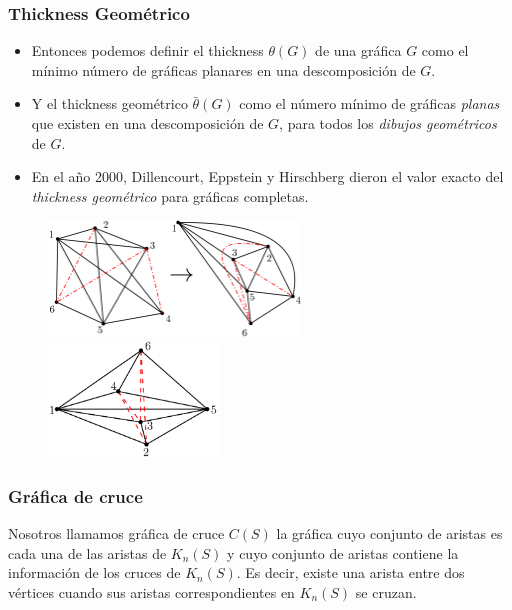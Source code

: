 \begin{frame}\frametitle{Thickness Geométrico}
	\begin{itemize}
		\item[] Entonces podemos definir el thickness $\theta(G)$ de una gráfica $G$ como el mínimo número de gráficas planares en una descomposición de $G$. 
		
		\item[] Y el thickness geométrico $\bar{\theta}(G)$ como el número mínimo de gráficas \emph{planas} que existen en una descomposición de $G$, para todos los \emph{dibujos geométricos} de $G$.
		
		\item[] En el año 2000, Dillencourt, Eppstein y Hirschberg dieron el valor exacto del \emph{thickness geométrico} para gráficas completas.\\[5pt]
	\end{itemize}
	
\end{frame}
\begin{frame}
	\begin{figure}
		\centering
		\includegraphics[width=0.6\textwidth]{images/K6_thicknes2}%
		~\vrule
		\includegraphics[width=0.4\textwidth]{images/K6_gthicknes2}
	\end{figure}
\end{frame}

\begin{frame}\frametitle{Gráfica de cruce}
Nosotros llamamos gráfica de cruce $C(S)$ la gráfica cuyo conjunto de aristas es cada una de las aristas de $K_n(S)$ y cuyo conjunto de aristas contiene la información de los cruces de $K_n(S)$. Es decir, existe una arista entre dos vértices cuando sus aristas correspondientes en $K_n(S)$ se cruzan.
\end{frame}

